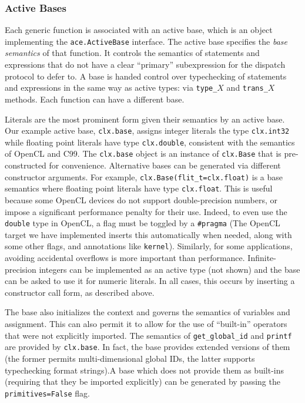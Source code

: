 \subsubsection{Active Bases}\label{abases}
Each generic function is associated with an active base, which is an object implementing the \verb|ace.ActiveBase| interface. The active base specifies the \emph{base semantics} of that function. It controls the semantics of statements and expressions that do not have a clear ``primary'' subexpression for the dispatch protocol to defer to. A base is handed control over typechecking of statements and expressions in the same way as active types: via \verb|type_|$X$ and \verb|trans_|$X$ methods.  Each function can have a different base.

Literals are the most prominent form given their semantics by an active base. Our example active base, \verb|clx.base|, assigns integer literals the type \verb|clx.int32| while floating point literals have type \verb|clx.double|, consistent with the semantics of OpenCL and C99. The \verb|clx.base| object is an instance of \verb|clx.Base| that is pre-constructed for convenience. Alternative bases can be generated via different constructor arguments. For example, \verb|clx.Base(flit_t=clx.float)| is a base semantics where floating point literals have type \verb|clx.float|. This is useful because some OpenCL devices do not support double-precision numbers, or impose a significant performance penalty for their use. Indeed, to even use the \verb|double| type in OpenCL, a flag must be toggled by a \verb|#pragma| (The OpenCL target we have implemented inserts this automatically when needed, along with some other flags, and annotations like \verb|kernel|).  Similarly, for some applications, avoiding accidental overflows is more important than performance.  Infinite-precision integers can be implemented as an active type (not shown) and the base can be asked to use it for numeric literals. In all cases, this occurs by inserting a constructor call form, as described above.%

The base also initializes the context and governs the semantics of variables and assignment. This can also permit it to allow for the use of ``built-in'' operators that were not explicitly imported. The semantics of \verb|get_global_id| and \verb|printf| are provided by \verb|clx.base|. In fact, the base provides extended versions of them (the former permits multi-dimensional global IDs, the latter supports typechecking format strings).A base which does not provide them as built-ins (requiring that they be imported explicitly) can be generated by passing the \verb|primitives=False| flag.

